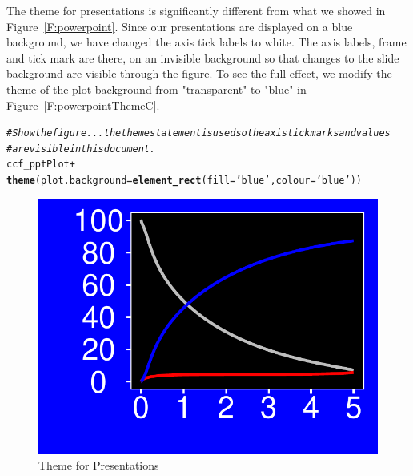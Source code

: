 \documentclass[nojss]{jss}\usepackage[]{graphicx}\usepackage[]{color}
\makeatletter
\def\maxwidth{ %
  \ifdim\Gin@nat@width>\linewidth
    \linewidth
  \else
    \Gin@nat@width
  \fi
}
\newcommand{\hlstr}[1]{\textcolor[rgb]{0.192,0.494,0.8}{#1}}%
\newcommand{\hlcom}[1]{\textcolor[rgb]{0.678,0.584,0.686}{\textit{#1}}}%
\newcommand{\hlopt}[1]{\textcolor[rgb]{0,0,0}{#1}}%
\newcommand{\hlstd}[1]{\textcolor[rgb]{0.345,0.345,0.345}{#1}}%
\newcommand{\hlkwc}[1]{\textcolor[rgb]{0.333,0.667,0.333}{#1}}%
\newcommand{\hlkwd}[1]{\textcolor[rgb]{0.737,0.353,0.396}{\textbf{#1}}}%
\newenvironment{kframe}{%
 \def\at@end@of@kframe{}%
 \ifinner\ifhmode%
  \def\at@end@of@kframe{\end{minipage}}%
  \begin{minipage}{\columnwidth}%
 \fi\fi%
 \def\FrameCommand##1{\hskip\@totalleftmargin \hskip-\fboxsep
 \colorbox{shadecolor}{##1}\hskip-\fboxsep
     \hskip-\linewidth \hskip-\@totalleftmargin \hskip\columnwidth}%
 \MakeFramed {\advance\hsize-\width
   \@totalleftmargin\z@ \linewidth\hsize
   \@setminipage}}%
 {\par\unskip\endMakeFramed%
 \at@end@of@kframe}
\newenvironment{knitrout}{}{} %
\makeatother
\begin{document}
The theme for presentations is significantly different from what we showed in Figure~\ref{F:powerpoint}. Since our presentations are displayed on a blue background, we have changed the axis tick labels to white. The axis labels, frame and tick mark are there, on an invisible background so that changes to the slide background are visible through the figure.  To see the full effect, we modify the theme of the plot background from "transparent" to "blue" in Figure~\ref{F:powerpointThemeC}.
\begin{knitrout}\footnotesize
{}\color{fgcolor}\begin{kframe}
\begin{alltt}
\hlcom{# Show the figure... the theme statement is used so the axis tick marks and values}
\hlcom{# are visible in this document.}
\hlstd{ccf_pptPlot} \hlopt{+}
  \hlkwd{theme}\hlstd{(}\hlkwc{plot.background} \hlstd{=} \hlkwd{element_rect}\hlstd{(}\hlkwc{fill}\hlstd{=}\hlstr{'blue'}\hlstd{,} \hlkwc{colour}\hlstd{=}\hlstr{'blue'}\hlstd{))}
\end{alltt}
\end{kframe}\begin{figure}[htpb]


{\centering \includegraphics[width=\maxwidth]{figure/beamer-powerpointTheme} 

}

\caption[Theme for Presentations]{Theme for Presentations\label{F:powerpointTheme}}
\end{figure}


\end{knitrout}
\end{document}
